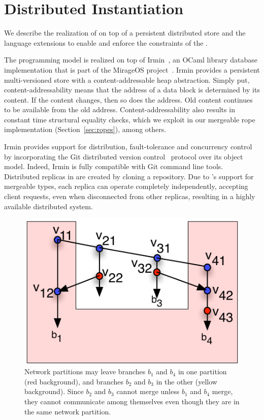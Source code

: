 \section{Distributed Instantiation}
\label{sec:implementation}

We describe the realization of \name on top of a persistent
distributed store and the language extensions to enable and enforce
the constraints of the \name.

The \name programming model is realized on top of Irmin~\cite{irmin},
an OCaml library database implementation that is part of the MirageOS
project~\cite{mirage}. Irmin provides a persistent multi-versioned
store with a content-addressable heap abstraction. Simply put,
content-addressability means that the address of a data block is
determined by its content. If the content changes, then so does the
address. Old content continues to be available from the old
address. Content-addressability also results in constant time
structural equality checks, which we exploit in our mergeable rope
implementation (Section~\ref{sec:ropes}), among others.

Irmin provides support for distribution, fault-tolerance and
concurrency control by incorporating the Git distributed version
control~\cite{git} protocol over its object model. Indeed, Irmin is
fully compatible with Git command line tools. Distributed replicas in
\name are created by cloning a \name repository. Due to \name's
support for mergeable types, each replica can operate completely
independently, accepting client requests, even when disconnected from
other replicas, resulting in a highly available distributed system.

\begin{figure}
	\begin{center}
	\includegraphics[scale=0.8]{Figures/partitions}
	\end{center}
	\caption{Network partitions may leave branches $b_1$ and $b_4$ in one
		partition (red background), and branches $b_2$ and $b_3$ in the other
		(yellow background). Since $b_2$ and $b_3$ cannot merge unless $b_1$ and
		$b_4$ merge, they cannot communicate among themselves even though they are in
		the same network partition.}
	\label{fig:partitions}
\end{figure}

